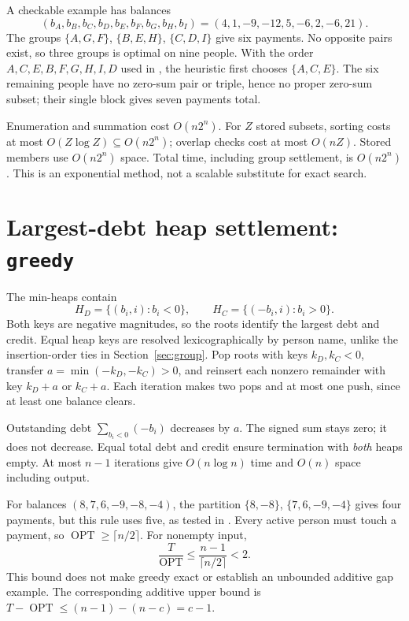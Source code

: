 \documentclass[11pt]{article}
\begin{document}
A checkable example has balances
\[
 (b_A,b_B,b_C,b_D,b_E,b_F,b_G,b_H,b_I)
       =(4,1,-9,-12,5,-6,2,-6,21).
\]
The groups $\{A,G,F\}$, $\{B,E,H\}$, $\{C,D,I\}$ give six payments.
No opposite pairs exist, so three groups is optimal on nine people.
With the order $A,C,E,B,F,G,H,I,D$ used in
, the heuristic first chooses $\{A,C,E\}$.
The six remaining people have no zero-sum pair or triple, hence no
proper zero-sum subset; their single block gives seven payments total.

Enumeration and summation cost $O(n2^n)$. For $Z$ stored subsets,
sorting costs at most $O(Z\log Z)\subseteq O(n2^n)$; overlap checks
cost at most $O(nZ)$. Stored members use $O(n2^n)$ space. Total time,
including group settlement, is $O(n2^n)$. This is an exponential method,
not a scalable substitute for exact search.

\section{Largest-debt heap settlement: \texttt{greedy}}\label{sec:greedy}
The min-heaps contain
\[
 H_D=\{(b_i,i):b_i<0\},\qquad H_C=\{(-b_i,i):b_i>0\}.
\]
Both keys are negative magnitudes, so the roots identify the largest
debt and credit. Equal heap keys are resolved lexicographically by person
name, unlike the insertion-order ties in Section~\ref{sec:group}.
Pop roots with keys $k_D,k_C<0$, transfer
$a=\min(-k_D,-k_C)>0$, and reinsert each nonzero remainder with key
$k_D+a$ or $k_C+a$. Each iteration makes two pops and at most one push,
since at least one balance clears.

Outstanding debt $\sum_{b_i<0}(-b_i)$ decreases by $a$. The signed sum
stays zero; it does not decrease. Equal total debt and credit ensure
termination with \emph{both} heaps empty. At most $n-1$ iterations give
$O(n\log n)$ time and $O(n)$ space including output.

For balances $(8,7,6,-9,-8,-4)$, the partition $\{8,-8\}$,
$\{7,6,-9,-4\}$ gives four payments, but this rule uses five, as tested
in . Every active person must touch a payment,
so $\operatorname{OPT}\geq\lceil n/2\rceil$. For nonempty input,
\[
 \frac{T}{\operatorname{OPT}}\leq
 \frac{n-1}{\lceil n/2\rceil}<2.
\]
This bound does not make greedy exact or establish an unbounded additive
gap example.
The corresponding additive upper bound is
$T-\operatorname{OPT}\leq(n-1)-(n-c)=c-1$.
\end{document}
